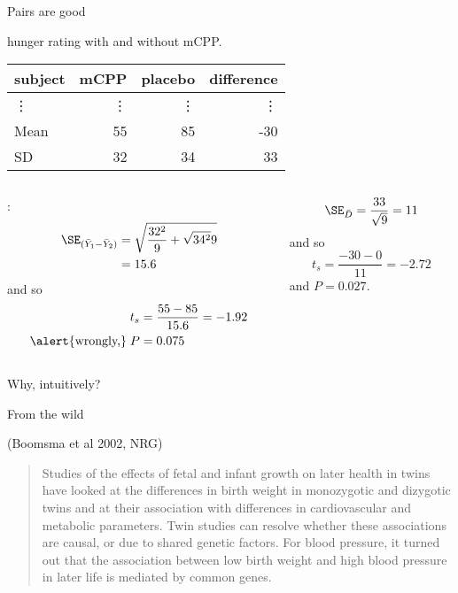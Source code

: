 \begin{frame}{Pairs are good}

     hunger rating with and without mCPP.
    \begin{center}
      \begin{tabular}{lrrr}
        \hline
        subject & mCPP & placebo & difference \\ 
        \hline
        \vdots & \vdots & \vdots & \vdots \\
        \hline
         Mean & 55 & 85 & -30 \\ 
         SD & 32 & 34 & 33 \\ 
         \hline
      \end{tabular}
    \end{center}

    \begin{columns}
      \begin{column}{.5\textwidth}
        :
      \begin{align*} 
        \SE_{(\bar Y_1 - \bar Y_2)} &= \sqrt{\frac{32^2}{9} + \sqrt{34^2}{9}} \\ 
        &= 15.6 
        \end{align*}
        and so
        \begin{align*}
      t_s &= \frac{55-85}{15.6} = -1.92  \\
      \text{\alert{wrongly,}} \; P&=0.075
    \end{align*}

      \end{column}
      \begin{column}{.5\textwidth}
        \begin{align*}
          \SE_{\bar D} = \frac{33}{\sqrt{9}} = 11
        \end{align*}
        and so
        \[  t_s = \frac{-30-0}{11} = -2.72 \]
        and $P = 0.027$.

      \end{column}
    \end{columns}

    \centering
    \alert{Why, intuitively?}

\end{frame}

\begin{frame}{From the wild}

   (Boomsma et al 2002, NRG)
  \begin{quote}
Studies of the effects of fetal and infant growth on later health in twins have looked at the differences in birth weight in monozygotic and dizygotic twins and at their association with differences in cardiovascular and metabolic parameters. Twin studies can resolve whether these associations are causal, or due to shared genetic factors. For blood pressure, it turned out that the association between low birth weight and high blood pressure in later life is mediated by common genes.
  \end{quote}
\end{frame}

